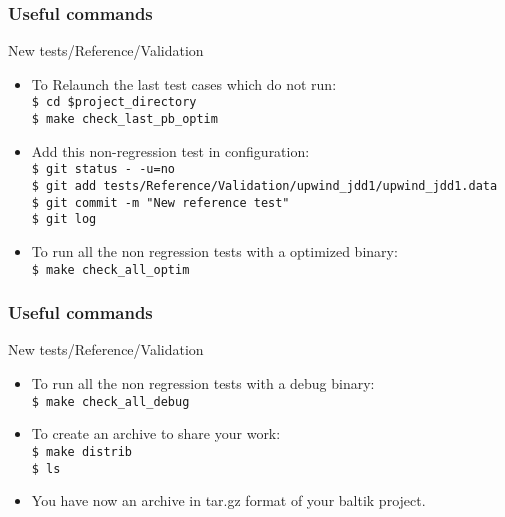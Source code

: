 \documentclass[10pt, hyperref={unicode=true,pdfusetitle, bookmarks=true,bookmarksnumbered=false,bookmarksopen=false, breaklinks=false,pdfborder={0 0 1},backref=true,colorlinks=true,linkcolor=darkblue,pageanchor, urlcolor=darkblue}]{beamer}
\begin{document}
\begin{frame}
\frametitle{Useful commands}
\begin{block}{New tests/Reference/Validation}

\begin{itemize}
\item To Relaunch the last test cases which do not run:\\
\texttt{\$ cd \$project\_directory}\\
\texttt{\$ make check\_last\_pb\_optim}\\
\item Add this non-regression test in configuration:\\
\texttt{\$ git status -\,-u=no}\\
\texttt{\$ git add tests/Reference/Validation/upwind\_jdd1/upwind\_jdd1.data}\\
\texttt{\$ git commit -m "New reference test"}\\
\texttt{\$ git log}\\
\item To run all the non regression tests with a optimized binary:\\
\texttt{\$ make check\_all\_optim}
\end{itemize}

\end{block}
\end{frame}
\begin{frame}
\frametitle{Useful commands}
\begin{block}{New tests/Reference/Validation}

\begin{itemize}
\item To run all the non regression tests with a debug binary:\\
\texttt{\$ make check\_all\_debug}
\item To create an archive to share your work:\\
\texttt{\$ make distrib}\\
\texttt{\$ ls}
\item You have now an archive in tar.gz format of your baltik project.

\end{itemize}

\end{block}
\end{frame}
\end{document}
